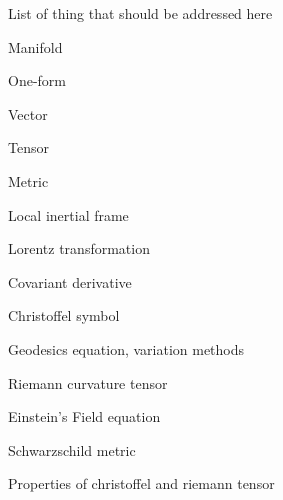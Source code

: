 \documentclass[main]{subfiles}
\begin{document}
List of thing that should be addressed here

Manifold

One-form

Vector

Tensor

Metric

Local inertial frame

Lorentz transformation

Covariant derivative

Christoffel symbol

Geodesics equation, variation methods

Riemann curvature tensor

Einstein's Field equation

Schwarzschild metric

Properties of christoffel and riemann tensor
\end{document}
